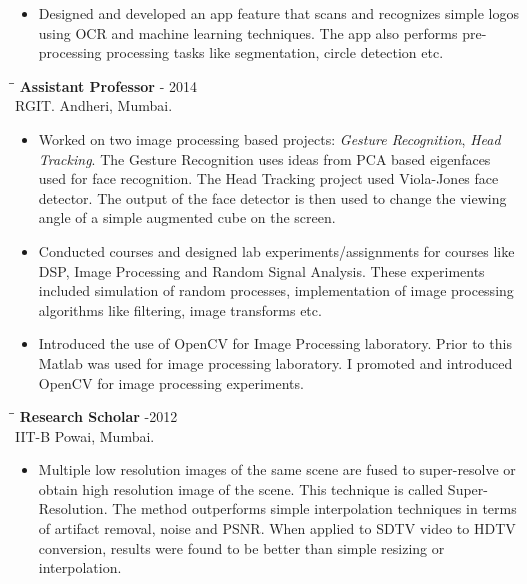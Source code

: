 \documentclass{res}
\begin{document}
\begin{resume}
\begin{itemize}
        \item Designed and developed an app feature that scans and recognizes
        simple logos using OCR and machine learning techniques. The app also performs pre-processing processing tasks like segmentation, circle detection etc. 

\end{itemize}

   \begin{tabbing}
   \hspace{2.3in}\= \hspace{2.6in}\= \kill %
    {\bf Assistant Professor} \> -  2014\\
                     RGIT.\>     \>Andheri, Mumbai.
   \end{tabbing}
   \begin{itemize}
\item Worked on  two image processing based projects: \textit{Gesture Recognition}, \textit{Head Tracking}. The Gesture Recognition 
uses ideas from PCA based eigenfaces used for face recognition.  The Head Tracking project used Viola-Jones face detector. The output of the face detector is then used to change the viewing angle of a simple augmented cube on the screen.  
  
\item Conducted courses and designed  lab experiments/assignments for courses
like DSP, Image Processing and Random Signal Analysis. These experiments included simulation of random processes,
 implementation of image processing algorithms like filtering, image transforms etc.  

\item Introduced the use of OpenCV for Image Processing laboratory. Prior to this Matlab was used for image processing laboratory. I promoted and introduced OpenCV for image processing experiments. 
\end{itemize}

   \begin{tabbing}%
   \hspace{2.3in}\= \hspace{2.6in}\= \kill %
   {\bf Research Scholar}  \>  -2012\\
                IIT-B\>    \>Powai, Mumbai.
   \end{tabbing}
 \begin{itemize}

\item Multiple low resolution images of the same scene are fused to super-resolve or obtain
high resolution image of the scene. This technique is called Super-Resolution. The method outperforms simple interpolation techniques in terms of  artifact removal, noise and PSNR. When applied to SDTV video to HDTV conversion, results were found to be better than simple resizing or interpolation. 


\end{itemize}
\end{resume}
\end{document}
